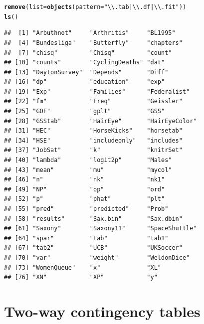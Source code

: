 \documentclass[11pt]{book}\usepackage[]{graphicx}\usepackage[]{color}
\makeatletter
\newcommand{\hlstr}[1]{\textcolor[rgb]{0.192,0.494,0.8}{#1}}%
\newcommand{\hlstd}[1]{\textcolor[rgb]{0.345,0.345,0.345}{#1}}%
\newcommand{\hlkwc}[1]{\textcolor[rgb]{0.333,0.667,0.333}{#1}}%
\newcommand{\hlkwd}[1]{\textcolor[rgb]{0.737,0.353,0.396}{\textbf{#1}}}%
\newenvironment{kframe}{%
 \def\at@end@of@kframe{}%
 \ifinner\ifhmode%
  \def\at@end@of@kframe{\end{minipage}}%
  \begin{minipage}{\columnwidth}%
 \fi\fi%
 \def\FrameCommand##1{\hskip\@totalleftmargin \hskip-\fboxsep
 \colorbox{shadecolor}{##1}\hskip-\fboxsep
     \hskip-\linewidth \hskip-\@totalleftmargin \hskip\columnwidth}%
 \MakeFramed {\advance\hsize-\width
   \@totalleftmargin\z@ \linewidth\hsize
   \@setminipage}}%
 {\par\unskip\endMakeFramed%
 \at@end@of@kframe}
\newenvironment{knitrout}{}{} %
\renewenvironment{knitrout}{\small\renewcommand{\baselinestretch}{.85}}{} %
\makeatother
\begin{document}
\begin{knitrout}
\color{fgcolor}\begin{kframe}
\begin{alltt}
\hlkwd{remove}\hlstd{(}\hlkwc{list}\hlstd{=}\hlkwd{objects}\hlstd{(}\hlkwc{pattern}\hlstd{=}\hlstr{"\textbackslash{}\textbackslash{}.tab|\textbackslash{}\textbackslash{}.df|\textbackslash{}\textbackslash{}.fit"}\hlstd{))}
\hlkwd{ls}\hlstd{()}
\end{alltt}
\begin{verbatim}
##  [1] "Arbuthnot"     "Arthritis"     "BL1995"       
##  [4] "Bundesliga"    "Butterfly"     "chapters"     
##  [7] "chisq"         "Chisq"         "count"        
## [10] "counts"        "CyclingDeaths" "dat"          
## [13] "DaytonSurvey"  "Depends"       "Diff"         
## [16] "dp"            "education"     "exp"          
## [19] "Exp"           "Families"      "Federalist"   
## [22] "fm"            "Freq"          "Geissler"     
## [25] "GOF"           "gplt"          "GSS"          
## [28] "GSStab"        "HairEye"       "HairEyeColor" 
## [31] "HEC"           "HorseKicks"    "horsetab"     
## [34] "HSE"           "includeonly"   "includes"     
## [37] "JobSat"        "k"             "knitrSet"     
## [40] "lambda"        "logit2p"       "Males"        
## [43] "mean"          "mu"            "mycol"        
## [46] "n"             "nk"            "nk1"          
## [49] "NP"            "op"            "ord"          
## [52] "p"             "phat"          "plt"          
## [55] "pred"          "predicted"     "Prob"         
## [58] "results"       "Sax.bin"       "Sax.dbin"     
## [61] "Saxony"        "Saxony11"      "SpaceShuttle" 
## [64] "spar"          "tab"           "tab1"         
## [67] "tab2"          "UCB"           "UKSoccer"     
## [70] "var"           "weight"        "WeldonDice"   
## [73] "WomenQueue"    "x"             "XL"           
## [76] "XN"            "XP"            "y"
\end{verbatim}
\end{kframe}
\end{knitrout}








\chapter{Two-way contingency tables}\label{ch:twoway}
\end{document}
